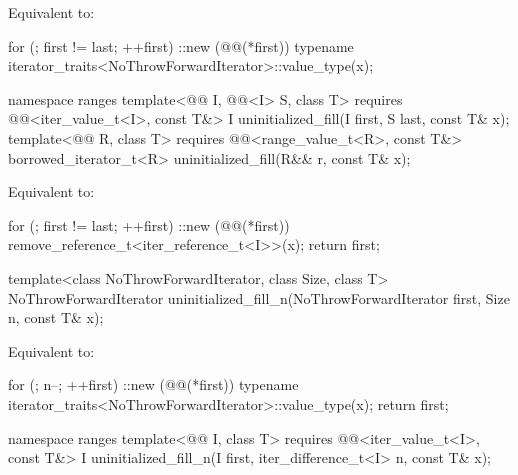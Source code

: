 \begin{itemdescr}
\pnum
\effects
Equivalent to:
\begin{codeblock}
for (; first != last; ++first)
  ::new (@@(*first))
    typename iterator_traits<NoThrowForwardIterator>::value_type(x);
\end{codeblock}
\end{itemdescr}

%
\begin{itemdecl}
namespace ranges {
  template<@@ I, @@<I> S, class T>
    requires @@<iter_value_t<I>, const T&>
    I uninitialized_fill(I first, S last, const T& x);
  template<@@ R, class T>
    requires @@<range_value_t<R>, const T&>
    borrowed_iterator_t<R> uninitialized_fill(R&& r, const T& x);
}
\end{itemdecl}

\begin{itemdescr}
\pnum
\effects
Equivalent to:
\begin{codeblock}
for (; first != last; ++first)
  ::new (@@(*first)) remove_reference_t<iter_reference_t<I>>(x);
return first;
\end{codeblock}
\end{itemdescr}

%
\begin{itemdecl}
template<class NoThrowForwardIterator, class Size, class T>
  NoThrowForwardIterator uninitialized_fill_n(NoThrowForwardIterator first, Size n, const T& x);
\end{itemdecl}

\begin{itemdescr}
\pnum
\effects
Equivalent to:
\begin{codeblock}
for (; n--; ++first)
  ::new (@@(*first))
    typename iterator_traits<NoThrowForwardIterator>::value_type(x);
return first;
\end{codeblock}
\end{itemdescr}

%
\begin{itemdecl}
namespace ranges {
  template<@@ I, class T>
    requires @@<iter_value_t<I>, const T&>
    I uninitialized_fill_n(I first, iter_difference_t<I> n, const T& x);
}
\end{itemdecl}

